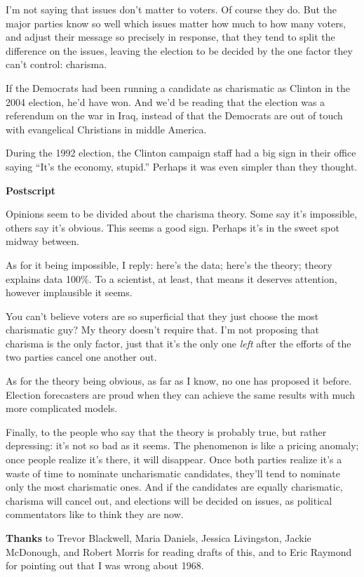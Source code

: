 \documentclass[12pt]{book}
\begin{document}
I'm not saying that issues don't matter to voters. Of course they do.
But the major parties know so well which issues matter how much to how
many voters, and adjust their message so precisely in response, that
they tend to split the difference on the issues, leaving the election to
be decided by the one factor they can't control: charisma.

If the Democrats had been running a candidate as charismatic as Clinton
in the 2004 election, he'd have won. And we'd be reading that the
election was a referendum on the war in Iraq, instead of that the
Democrats are out of touch with evangelical Christians in middle
America.

During the 1992 election, the Clinton campaign staff had a big sign in
their office saying ``It's the economy, stupid.'' Perhaps it was even
simpler than they thought.

\textbf{Postscript}

Opinions seem to be divided about the charisma theory. Some say it's
impossible, others say it's obvious. This seems a good sign. Perhaps
it's in the sweet spot midway between.

As for it being impossible, I reply: here's the data; here's the theory;
theory explains data 100\%. To a scientist, at least, that means it
deserves attention, however implausible it seems.

You can't believe voters are so superficial that they just choose the
most charismatic guy? My theory doesn't require that. I'm not proposing
that charisma is the only factor, just that it's the only one
\emph{left} after the efforts of the two parties cancel one another out.

As for the theory being obvious, as far as I know, no one has proposed
it before. Election forecasters are proud when they can achieve the same
results with much more complicated models.

Finally, to the people who say that the theory is probably true, but
rather depressing: it's not so bad as it seems. The phenomenon is like a
pricing anomaly; once people realize it's there, it will disappear. Once
both parties realize it's a waste of time to nominate uncharismatic
candidates, they'll tend to nominate only the most charismatic ones. And
if the candidates are equally charismatic, charisma will cancel out, and
elections will be decided on issues, as political commentators like to
think they are now.


\textbf{Thanks} to Trevor Blackwell, Maria Daniels, Jessica Livingston,
Jackie McDonough, and Robert Morris for reading drafts of this, and to
Eric Raymond for pointing out that I was wrong about 1968.
\end{document}
